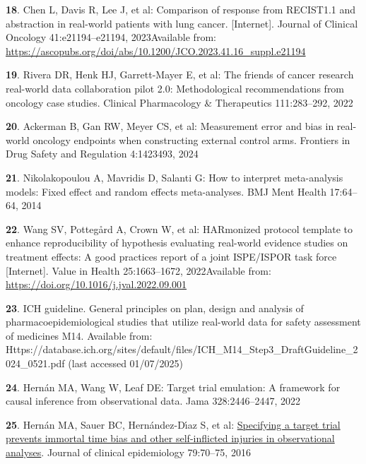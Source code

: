 \documentclass[
  letterpaper,
  DIV=11,
  numbers=noendperiod]{scrartcl}
\newlength{\cslhangindent}
\newenvironment{CSLReferences}[2] %
 {\begin{list}{}{%
  \setlength{\itemindent}{0pt}
  \setlength{\leftmargin}{0pt}
  \setlength{\parsep}{0pt}
  \ifodd #1
   \setlength{\leftmargin}{\cslhangindent}
   \setlength{\itemindent}{-1\cslhangindent}
  \fi
  \setlength{\itemsep}{#2\baselineskip}}}
 {\end{list}}
\begin{document}
\begin{CSLReferences}{0}{1}
\textbf{18}. Chen L, Davis R, Lee J, et al: Comparison of response from
RECIST1.1 and abstraction in real-world patients with lung cancer.
{[}Internet{]}. Journal of Clinical Oncology 41:e21194--e21194,
2023Available from:
\url{https://ascopubs.org/doi/abs/10.1200/JCO.2023.41.16_suppl.e21194}

\textbf{19}. Rivera DR, Henk HJ, Garrett-Mayer E, et al: The friends of
cancer research real-world data collaboration pilot 2.0: Methodological
recommendations from oncology case studies. Clinical Pharmacology \&
Therapeutics 111:283--292, 2022

\textbf{20}. Ackerman B, Gan RW, Meyer CS, et al: Measurement error and
bias in real-world oncology endpoints when constructing external control
arms. Frontiers in Drug Safety and Regulation 4:1423493, 2024

\textbf{21}. Nikolakopoulou A, Mavridis D, Salanti G: How to interpret
meta-analysis models: Fixed effect and random effects meta-analyses. BMJ
Ment Health 17:64--64, 2014

\textbf{22}. Wang SV, Pottegård A, Crown W, et al: HARmonized protocol
template to enhance reproducibility of hypothesis evaluating real-world
evidence studies on treatment effects: A good practices report of a
joint ISPE/ISPOR task force {[}Internet{]}. Value in Health
25:1663--1672, 2022Available from:
\url{https://doi.org/10.1016/j.jval.2022.09.001}

\textbf{23}. ICH guideline. General principles on plan, design and
analysis of pharmacoepidemiological studies that utilize real-world data
for safety assessment of medicines M14. Available from:
Https://database.ich.org/sites/default/files/ICH\_M14\_Step3\_DraftGuideline\_2024\_0521.pdf
(last accessed 01/07/2025)

\textbf{24}. Hernán MA, Wang W, Leaf DE: Target trial emulation: A
framework for causal inference from observational data. Jama
328:2446--2447, 2022

\textbf{25}. Hernán MA, Sauer BC, Hernández-Dı́az S, et al:
\href{https://doi.org/10.1016/j.jclinepi.2016.04.014}{Specifying a
target trial prevents immortal time bias and other self-inflicted
injuries in observational analyses}. Journal of clinical epidemiology
79:70--75, 2016


\end{CSLReferences}
\end{document}
